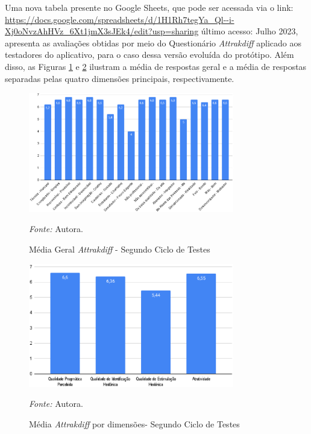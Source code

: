 Uma nova tabela presente no Google Sheets, que pode ser acessada via o link: 
\url{https://docs.google.com/spreadsheets/d/1H1Rh7tegYa_Ql--i-Xj0oNvzAhHVz_6Xt1jmX3sJEk4/edit?usp=sharing} último acesso: Julho 2023, apresenta as avaliações obtidas por meio do Questionário \textit{Attrakdiff} aplicado aos testadores do aplicativo, para o caso 
dessa versão evoluída do protótipo. Além disso, as Figuras \ref{fig28} e \ref{fig29} ilustram a média de respostas geral e a média de respostas separadas pelas quatro dimensões principais, respectivamente.

\begin{figure}[h!]
	\centering
	\caption{Média Geral \textit{Attrakdiff} - Segundo Ciclo de Testes}
	\begin{adjustbox}{center}
		\includegraphics[width=0.8\textwidth]{figuras/media-geral1.eps}
	\end{adjustbox}
	\begin{tablenotes}[flushleft]
		\centering
		\item \textit{Fonte:} Autora.
	\end{tablenotes}
	\label{fig28}
\end{figure}

\begin{figure}[h!]
	\centering
	\caption{Média \textit{Attrakdiff} por dimensões- Segundo Ciclo de Testes}
	\begin{adjustbox}{center}
		\includegraphics[width=0.8\textwidth]{figuras/media-separada1.eps}
	\end{adjustbox}
	\begin{tablenotes}[flushleft]
		\centering
		\item \textit{Fonte:} Autora.
	\end{tablenotes}
	\label{fig29}
\end{figure}

